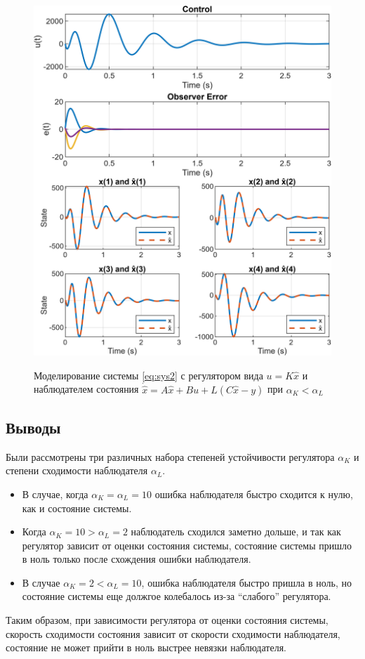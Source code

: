 \begin{figure}[H]
    \centering
    \caption{Моделирование системы \eqref{eq:sys2} с регулятором вида $u=K\hat x$
    и наблюдателем состояния $\dot{\hat x}=A\hat x+Bu+L(C\hat x-y)$ при $\alpha_K<\alpha_L$}
    \includegraphics[width=\linewidth]{figs/task2_3.png}
    \label{fig:23}
\end{figure}


\subsection{Выводы}

Были рассмотрены три различных набора степеней устойчивости регулятора $\alpha_K$ 
и степени сходимости наблюдателя $\alpha_L$. 
\begin{itemize}
    \item В случае, когда $\alpha_K = \alpha_L = 10$ ошибка наблюдателя быстро сходится к нулю,
    как и состояние системы. 
    \item Когда $\alpha_K=10 > \alpha_L=2$ наблюдатель сходился заметно дольше, и так как
    регулятор зависит от оценки состояния системы, состояние системы пришло в ноль только
    после схождения ошибки наблюдателя.
    \item В случае $\alpha_K=2 < \alpha_L=10$, ошибка наблюдателя быстро пришла в ноль, но
    состояние системы еще должгое колебалось из-за ``слабого'' регулятора.
\end{itemize}
Таким образом, при зависимости регулятора от оценки состояния системы, скорость
сходимости состояния зависит от скорости сходимости наблюдателя, состояние не может
прийти в ноль выстрее невязки наблюдателя.



